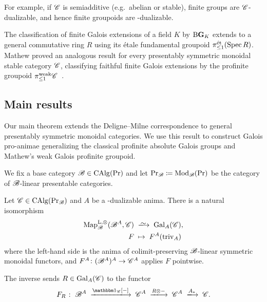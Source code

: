 \documentclass[english,svgnames,table]{article}
\begin{document}
For example, if $\mathscr{C}$ is semiadditive (e.g.\ abelian or stable), finite groups are $\mathscr{C}$-dualizable, and hence finite groupoids are \CO-dualizable.

The classification of finite Galois extensions of a field $K$ by $\mathrm{B}\mathbf{G}_K$ extends to a general commutative ring $R$ using its \'etale fundamental groupoid $\pi^{\mathrm{\acute{e}t}}_{\le 1} (\operatorname{Spec} R)$.
Mathew proved an analogous result for every presentably symmetric monoidal stable category $\mathscr{C}$, classifying faithful finite Galois extensions by the profinite groupoid $\pi_{\le 1}^{\mathrm{weak}}\mathscr{C}$~\cite[Definition~6.8 and Proposition~6.13]{Mathew-2016-Galois}.

\subsection{Main results}

    Our main theorem extends the Deligne--Milne correspondence to general presentably symmetric monoidal categories. We use this result to construct Galois pro-animae generalizing the classical profinite absolute Galois groups and Mathew's weak Galois profinite groupoid.

    We fix a base category $\mathscr{B} \in \operatorname{CAlg}(\operatorname{Pr})$ and let $\operatorname{Pr}_{\mathscr{B}} \coloneq \operatorname{Mod}_{\mathscr{B}}(\operatorname{Pr})$ be the category of $\mathscr{B}$-linear presentable categories.

    \begin{alphThm}
    \label{alphthm:Galois-co-representable}
        Let $\mathscr{C} \in \operatorname{CAlg}(\operatorname{Pr}_{\mathscr{B}})$ and $A$ be a \COB-dualizable anima.
        There is a natural isomorphism
        \begin{equation*}
            \begin{split}
                \MapBo(\basecat^A, \cC) & \;\isotoo\; \Gal_A(\cC), \\
                F & \;\mapsto\; F^A(\triv_A)
            \end{split}
        \end{equation*}
        where the left-hand side is the anima of colimit-preserving $\mathscr{B}$-linear symmetric monoidal functors, and $F^A \colon (\mathscr{B}^A)^A \to \mathscr{C}^A$ applies $F$ pointwise.
    \end{alphThm}
    The inverse sends $R \in \mathrm{Gal}_A(\mathscr{C})$ to the functor
    \begin{equation*}
        F_R \;\colon\; \basecat^A \;\xtoo{\ounit_{\cC}[-]}\; \cC^A \;\xtoo{R \otimes -}\; \cC^A \;\xtoo{A_*}\; \cC.
    \end{equation*}
\end{document}
